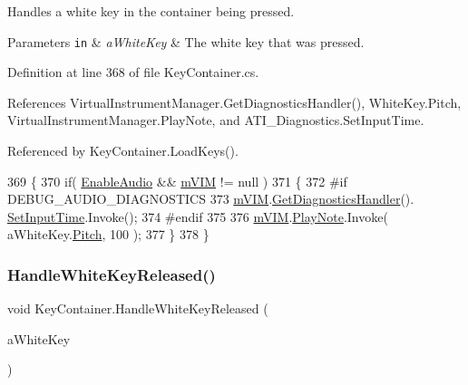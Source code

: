 Handles a white key in the container being pressed. 


\begin{DoxyParams}[1]{Parameters}
\mbox{\tt in}  & {\em a\+White\+Key} & The white key that was pressed. \\
\hline
\end{DoxyParams}


Definition at line 368 of file Key\+Container.\+cs.



References Virtual\+Instrument\+Manager.\+Get\+Diagnostics\+Handler(), White\+Key.\+Pitch, Virtual\+Instrument\+Manager.\+Play\+Note, and A\+T\+I\+\_\+\+Diagnostics.\+Set\+Input\+Time.



Referenced by Key\+Container.\+Load\+Keys().


\begin{DoxyCode}
369     \{
370         \textcolor{keywordflow}{if}( \hyperlink{group___key_contain_pub_var_ga5dc9b1349f8fafc894c7f739f6780a8c}{EnableAudio} && \hyperlink{group___key_contain_priv_var_ga57ee3824e2f284403bb70ad9c4dfd307}{mVIM} != null )
371         \{
372 \textcolor{preprocessor}{            #if DEBUG\_AUDIO\_DIAGNOSTICS}
373                 \hyperlink{group___key_contain_priv_var_ga57ee3824e2f284403bb70ad9c4dfd307}{mVIM}.\hyperlink{group___v_i_m_pub_func_ga7e60bc3c5464d8f34f0d56def675bcc6}{GetDiagnosticsHandler}().
      \hyperlink{group___audio_testing_a133561901c2aef535b2f3c098e55b959}{SetInputTime}.Invoke();
374 \textcolor{preprocessor}{            #endif}
375 
376             \hyperlink{group___key_contain_priv_var_ga57ee3824e2f284403bb70ad9c4dfd307}{mVIM}.\hyperlink{group___v_i_m_events_gaa21021c13a8c9d13cbf374d5bf9d68fa}{PlayNote}.Invoke( aWhiteKey.\hyperlink{group___white_key_pub_var_ga1ddd98b85ba069defc7cf47d25f625f4}{Pitch}, 100 );
377         \}
378     \}
\end{DoxyCode}
\mbox{\label{group___key_contain_handlers_ga5b98b0105300225fd79638525ad3cb3c}} 
\subsubsection{\texorpdfstring{Handle\+White\+Key\+Released()}{HandleWhiteKeyReleased()}}
{\footnotesize\ttfamily void Key\+Container.\+Handle\+White\+Key\+Released (\begin{DoxyParamCaption}\item[{\hyperlink{class_white_key}{White\+Key}}]{a\+White\+Key }\end{DoxyParamCaption})\hspace{0.3cm}{\ttfamily [private]}}



